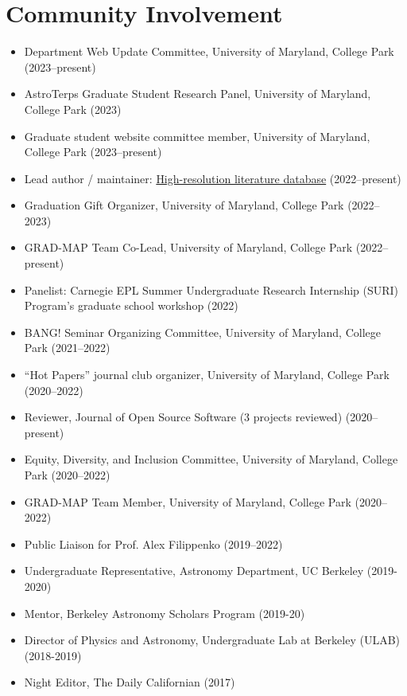 \documentclass[letterpaper,11.5pt]{article}
\newcommand{\resumeItem}[2]{
  \item\small{
    \textbf{#1}{#2 \vspace{-2pt}}
  }
}
\newcommand{\resumeSubHeadingListEnd}{\end{itemize}}
\newcommand{\resumeItemListStart}{\begin{itemize}}
\newcommand{\resumeItemListEnd}{\end{itemize}\vspace{-5pt}}
\newcommand{\shorterSection}[1]{\vspace{-10pt}\section{#1}}
\begin{document}
    




\vspace{-6pt}
\shorterSection{Community Involvement}
\resumeItemListStart
\resumeItem{}{Department Web Update Committee, University of Maryland, College Park (2023--present)}
\resumeItem{}{AstroTerps Graduate Student Research Panel, University of Maryland, College Park (2023)}
\resumeItem{}{Graduate student website committee member, University of Maryland, College Park (2023--present)}
\resumeItem{}{Lead author / maintainer: \href{https://www.arjunsavel.com/hires_papers.html}{High-resolution literature database} (2022--present)}
\resumeItem{}{Graduation Gift Organizer, University of Maryland, College Park (2022--2023)}
\resumeItem{}{GRAD-MAP Team Co-Lead, University of Maryland, College Park (2022--present)}
\resumeItem{}{Panelist: Carnegie EPL Summer Undergraduate Research Internship (SURI) Program’s graduate school workshop (2022)}
\resumeItem{}{BANG! Seminar Organizing Committee, University of Maryland, College Park (2021--2022)}
\resumeItem{}{``Hot Papers'' journal club organizer, University of Maryland, College Park (2020--2022)}
\resumeItem{}{Reviewer, Journal of Open Source Software (3 projects reviewed) (2020--present)}
\resumeItem{}{Equity, Diversity, and Inclusion Committee, University of Maryland, College Park (2020--2022)}
\resumeItem{}{GRAD-MAP Team Member, University of Maryland, College Park (2020--2022)}
\resumeItem{}{Public Liaison for Prof. Alex Filippenko (2019--2022)}
\resumeItem{}{Undergraduate Representative, Astronomy Department, UC Berkeley (2019-2020)}
\resumeItem{}{Mentor, Berkeley Astronomy Scholars Program (2019-20)}
\resumeItem{}{Director of Physics and Astronomy, Undergraduate Lab at Berkeley (ULAB) (2018-2019)}
\resumeItem{}{Night Editor, The Daily Californian (2017)}
\resumeItemListEnd
\end{document}
